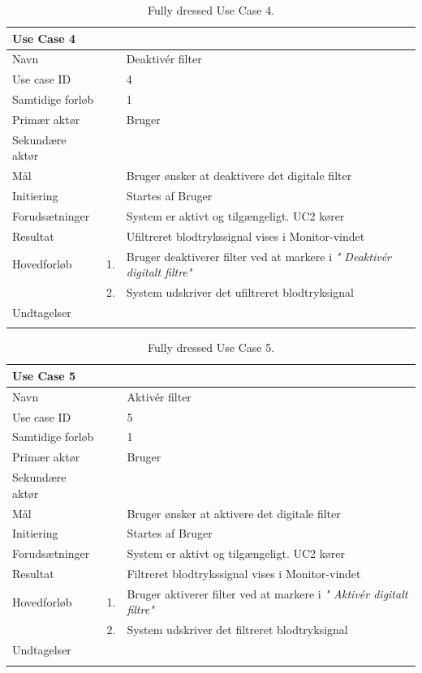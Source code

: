 \begin{longtabu} to  %
    {\large \textbf{Use Case 4}} && \\
    \toprule
    Navn &&    Deaktivér filter\\
    Use case ID &&    4\\
    Samtidige forløb &&   1\\
    Primær aktør &&    Bruger\\
    Sekundære aktør &&	 \\
    Mål &&    Bruger ønsker at deaktivere det digitale filter\\
    Initiering &&	Startes af Bruger\\
    Forudsætninger &&  System er aktivt og tilgængeligt. UC2 kører  \\
    Resultat &&		Ufiltreret blodtrykssignal vises i Monitor-vindet                 \\ \midrule
    Hovedforløb &    1. &    Bruger deaktiverer filter ved at markere i \textit{" Deaktivér digitalt filtre"} \\[-1ex]   						 	
                &    2. &    System udskriver det ufiltreret blodtryksignal\newline\\ \midrule
                
    Undtagelser &     &      \\ \bottomrule
\caption{Fully dressed Use Case 4.}
\label{UC4}
\end{longtabu}


\begin{longtabu} to  %
    {\large \textbf{Use Case 5}} && \\
    \toprule
    Navn &&    Aktivér filter\\
    Use case ID &&    5\\
    Samtidige forløb &&   1\\
    Primær aktør &&    Bruger\\
    Sekundære aktør &&	 \\
    Mål &&    Bruger ønsker at aktivere det digitale filter\\
    Initiering &&	Startes af Bruger\\
    Forudsætninger &&  System er aktivt og tilgængeligt. UC2 kører  \\
    Resultat &&		Filtreret blodtrykssignal vises i Monitor-vindet                 \\ \midrule
    Hovedforløb &    1. &    Bruger aktiverer filter ved at markere i \textit{" Aktivér digitalt filtre"} \\[-1ex]   						 	
                &    2. &    System udskriver det filtreret blodtryksignal\newline\\ \midrule
                
    Undtagelser &     &      \\ \bottomrule
\caption{Fully dressed Use Case 5.}
\label{UC5}
\end{longtabu}
    
